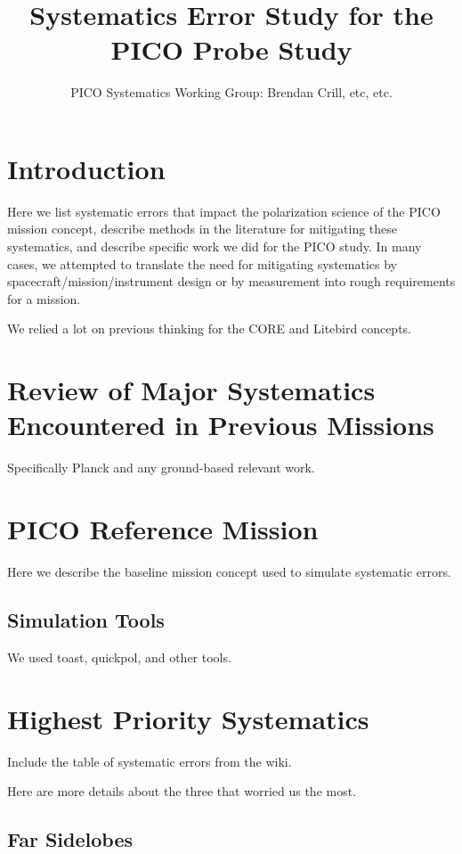 \documentclass[12pt]{article}
\title{Systematics Error Study for the PICO Probe Study}
\author{PICO Systematics Working Group: Brendan Crill, etc, etc.}
\begin{document}
  \maketitle 

\section{Introduction}

Here we list systematic errors that impact the polarization science of the PICO mission concept, describe methods in the literature for mitigating these systematics, and describe specific work we did for the PICO study.  In many cases, we attempted to translate the need for mitigating systematics by spacecraft/mission/instrument design or by measurement into rough requirements for a mission.

We relied a lot on previous thinking for the CORE and Litebird concepts.

\section{Review of Major Systematics Encountered in Previous Missions}

Specifically Planck and any ground-based relevant work.

\section{PICO Reference Mission}

Here we describe the baseline mission concept used to simulate systematic errors.

\subsection{Simulation Tools}

We used toast, quickpol, and other tools.

\section{Highest Priority Systematics}

Include the table of systematic errors from the wiki.

Here are more details about the three that worried us the most.

\subsection{Far Sidelobes}
\end{document}
